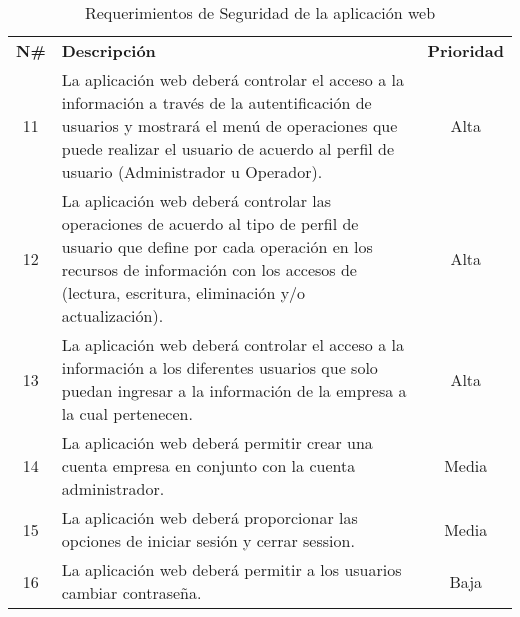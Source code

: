 \begin{table}[H]
	\centering
    \begin{tabular}{ |c|p{10cm}|c| }
	  \hline
	  \rowcolor{indigo-dark} \multicolumn{3}{|c|}{ \textcolor{white}{\textbf{Administración de Seguridad}}} \\
	  \hline
	  \rowcolor{indigo-light} \textbf{N\#} & \centering \textbf{Descripción} & \textbf{Prioridad} \\
	  \hline
	  11 & La aplicación web deberá controlar el acceso a la información a través de la autentificación de usuarios y mostrará el menú de operaciones que puede realizar el usuario de acuerdo al perfil de usuario (Administrador u Operador). & Alta\\
	  \hline
	  12 & La aplicación web deberá controlar las operaciones de acuerdo al tipo de perfil  de usuario que define por cada operación en los recursos de información con los accesos de (lectura, escritura, eliminación y/o actualización). & Alta\\
	  \hline
	  13 & La aplicación web deberá controlar el acceso a la información a los diferentes usuarios que solo puedan ingresar a la información de la empresa a la cual pertenecen. & Alta \\
	  \hline
	  14 & La aplicación web deberá permitir crear una cuenta empresa en conjunto con la cuenta administrador. & Media \\
	  \hline
	  15 & La aplicación web deberá proporcionar las opciones de iniciar sesión y cerrar session. &  Media\\
	  \hline
	  16 & La aplicación web deberá permitir a los usuarios cambiar contraseña. &  Baja \\
	  \hline
	\end{tabular}
	\caption{Requerimientos de Seguridad de la aplicación web}
\end{table}

